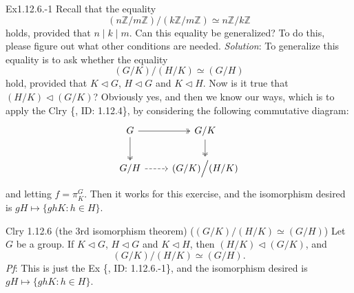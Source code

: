 \documentclass{article}
\newcommand{\nles}{\vartriangleleft}
\begin{document}
\begin{Th}{Ex1.12.6.-1}
    Recall that the equality
    $$ (n\mathbb{Z}/m\mathbb{Z})\Big/ (k\mathbb{Z}/m\mathbb{Z}) \simeq n\mathbb{Z}/k\mathbb{Z} $$
    holds, provided that $n\mid k\mid m$. Can this equality be generalized? To do this, please figure out what other conditions are needed.
    \tcblower
    \textit{Solution}: To generalize this equality is to ask whether the equality
    $$ (G/K)\Big/ (H/K) \simeq (G/H) $$
    hold, provided that \textcolor{P}{$K\nles G$, $H\nles G$ and $K\nles H$}. Now is it true that $(H/K)\nles (G/K)$? Obviously yes, and then we know our ways, which is to apply the Clry \{, ID: 1.12.4\}, by considering the following commutative diagram:
    $$ \begin{tikzcd}
        G \arrow[r, two heads] \arrow[d, two heads] & G/K \arrow[d, two heads]\\
        G/H \arrow[r, dashed] & (G/K)\Big/ (H/K) 
    \end{tikzcd} $$
    and letting $f = \pi_K^G$. Then it works for this exercise, and the isomorphism desired is $gH\mapsto \{ghK: h\in H\}$.
\end{Th}

\begin{Th}{Clry 1.12.6 (the 3rd isomorphism theorem) ($ (G/K)\Big/ (H/K) \simeq (G/H) $)}
    Let $G$ be a group. If $K\nles G$, $H\nles G$ and $K\nles H$, then $(H/K)\nles (G/K)$, and
    $$ (G/K)\Big/ (H/K) \simeq (G/H). $$ 
    \tcblower
    \textit{Pf}: This is just the Ex \{, ID: 1.12.6.-1\}, and the isomorphism desired is $gH\mapsto \{ghK: h\in H\}$.
\end{Th}
\end{document}
